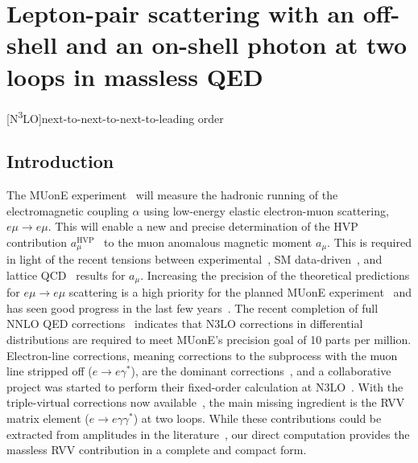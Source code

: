 \documentclass[main.tex]{subfiles}
\begin{document}
\chapter{Lepton-pair scattering with an off-shell and an on-shell photon at two loops in massless QED} \label{sec:QEDpaper}
\begin{acronym}
    [N\textsuperscript{3}LO]{next-to-next-to-next-to-leading order}
\end{acronym}

\section{Introduction}
The MUonE experiment~\cite{Abbiendi:2016xup,Abbiendi:2022oks,Spedicato:2022qtw,Pilato:2022wvg} will measure the hadronic running of the electromagnetic coupling $\alpha$ using low-energy elastic electron-muon scattering, $e\mu \to e\mu$.
This will enable a new and precise determination of the \ac{HVP} contribution $a_{\mu}^{\text{HVP}}$~\cite{CarloniCalame:2015obs,Balzani:2021del} to the muon anomalous magnetic moment $a_{\mu}$. This is required in light of the recent tensions between experimental~\cite{Muong-2:2021ojo}, \ac{SM} data-driven~\cite{Aoyama:2020ynm}, and lattice \ac{QCD}~\cite{Borsanyi:2020mff} results for $a_\mu$.
Increasing the precision of the theoretical predictions for $e\mu \to e\mu$ scattering is a high priority for the planned MUonE experiment~\cite{Banerjee:2020tdt,Budassi:2022dco} and has seen good progress in the last few years~\cite{Alacevich:2018vez,Budassi:2021twh,Fael:2019nsf,Fael:2018dmz,CarloniCalame:2020yoz}.
The recent completion of full \ac{NNLO} \ac{QED} corrections~\cite{Broggio:2022htr} indicates that 
\ac{N3LO} corrections in differential distributions are required to meet MUonE's precision goal of 10 parts per million.
Electron-line corrections, meaning corrections to the subprocess with the muon line stripped off ($e\to e \gamma^*$), are the dominant corrections~\cite{Broggio:2022htr}, and a collaborative project was started to perform their fixed-order calculation at \ac{N3LO}~\cite{Durham:n3lo}.
With the triple-virtual corrections now available~\cite{Fael:2022rgm,Fael:2022miw,Fael:2023zqr}, the main missing ingredient is the \ac{RVV} matrix element ($e\to e \gamma \gamma^*$) at two loops.
While these contributions could be extracted from amplitudes in the literature~\cite{Garland:2001tf,Garland:2002ak,Gehrmann:2011ab}, our direct computation provides the massless \ac{RVV} contribution in a complete and compact form.
\end{document}
